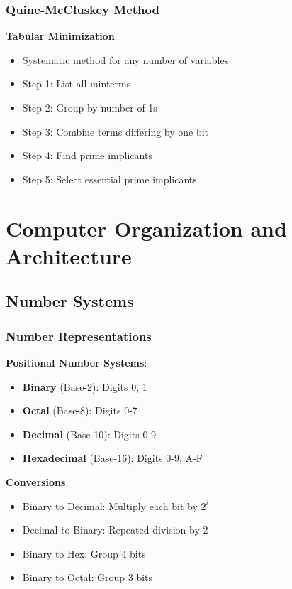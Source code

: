\documentclass[12pt,a4paper]{report}
\begin{document}
\subsection{Quine-McCluskey Method}
\begin{concept}
\textbf{Tabular Minimization}:
\begin{itemize}
    \item Systematic method for any number of variables
    \item Step 1: List all minterms
    \item Step 2: Group by number of 1s
    \item Step 3: Combine terms differing by one bit
    \item Step 4: Find prime implicants
    \item Step 5: Select essential prime implicants
\end{itemize}
\end{concept}

\chapter{Computer Organization and Architecture}

\section{Number Systems}

\subsection{Number Representations}
\begin{concept}
\textbf{Positional Number Systems}:
\begin{itemize}
    \item \textbf{Binary} (Base-2): Digits 0, 1
    \item \textbf{Octal} (Base-8): Digits 0-7
    \item \textbf{Decimal} (Base-10): Digits 0-9
    \item \textbf{Hexadecimal} (Base-16): Digits 0-9, A-F
\end{itemize}

\textbf{Conversions}:
\begin{itemize}
    \item Binary to Decimal: Multiply each bit by $2^i$
    \item Decimal to Binary: Repeated division by 2
    \item Binary to Hex: Group 4 bits
    \item Binary to Octal: Group 3 bits
\end{itemize}
\end{concept}
\end{document}
